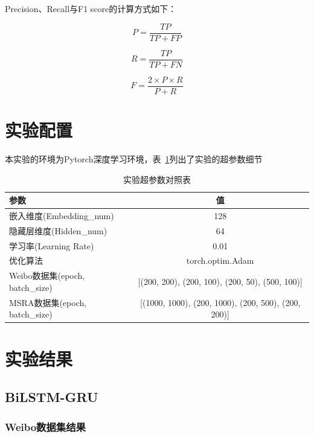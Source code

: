 Precision、Recall与F1 score的计算方式如下：

\begin{equation}
    P = \frac{TP}{TP + FP}
\end{equation}

\begin{equation}
    R = \frac{TP}{TP + FN}
\end{equation}

\begin{equation}
    F = \frac{2 \times P \times R}{P + R}
\end{equation}

\section{实验配置}

本实验的环境为Pytorch深度学习环境，表~\ref{tab:hyper_parameter_setting}列出了实验的超参数细节

\begin{table}[!hpt]
    \caption[实验超参数对照表]{实验超参数对照表}
    \label{tab:hyper_parameter_setting}
    \centering
    \begin{tabular}{lc} \toprule
        参数 & 值 \\ \midrule
        嵌入维度(Embedding\_num) & 128 \\
        隐藏层维度(Hidden\_num) & 64 \\
        学习率(Learning Rate) & 0.01 \\
        优化算法  & torch.optim.Adam \\
        Weibo数据集(epoch, batch\_size) & [(200, 200), (200, 100), (200, 50), (500, 100)] \\
        MSRA数据集(epoch, batch\_size) & [(1000, 1000), (200, 1000), (200, 500), (200, 200)] \\ \bottomrule
    \end{tabular}
\end{table}


\section{实验结果}

\subsection{BiLSTM-GRU}

\subsubsection{Weibo数据集结果}


